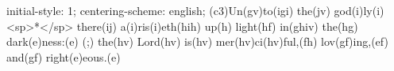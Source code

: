 initial-style: 1;
centering-scheme: english;
(c3)Un(gv)to(igi) the(jv) god(i)ly(i) <sp>*</sp> there(ij) a(i)ris(i)eth(hih) up(h) light(hf) in(ghiv) the(hg) dark(e)ness:(e) (;) the(hv) Lord(hv) is(hv) mer(hv)ci(hv)ful,(fh) lov(gf)ing,(ef) and(gf) right(e)eous.(e)